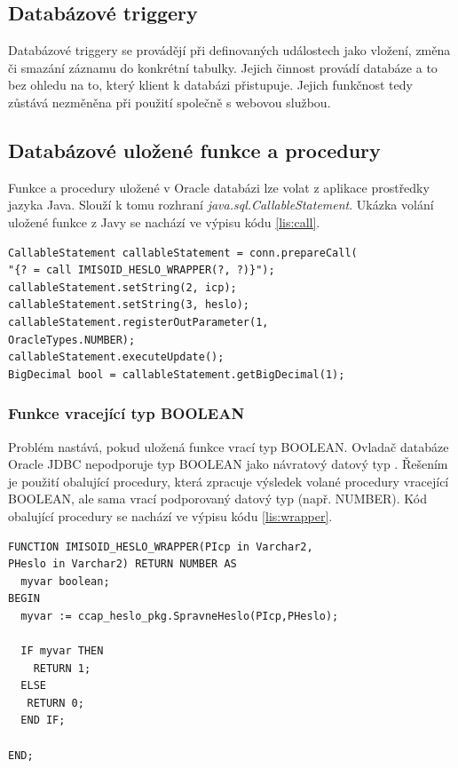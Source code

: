 \documentclass{diplomka}
\begin{document}
\subsection{Databázové triggery}
Databázové triggery se provádějí při definovaných událostech jako vložení, změna či smazání záznamu do konkrétní tabulky. Jejich činnost provádí databáze a to bez ohledu na to, který klient k databázi přistupuje. Jejich funkčnost tedy zůstává nezměněna při použití společně s webovou službou.

\subsection{Databázové uložené funkce a  procedury}
Funkce a procedury uložené v Oracle databázi lze volat z aplikace prostředky jazyka Java. Slouží k tomu rozhraní \emph{java.sql.CallableStatement}. Ukázka volání uložené funkce z Javy se nachází ve výpisu kódu \ref{lis:call}.\\

\begin{lstlisting}[label=lis:call, caption=Volání uložené procedury]
CallableStatement callableStatement = conn.prepareCall(
"{? = call IMISOID_HESLO_WRAPPER(?, ?)}");
callableStatement.setString(2, icp);
callableStatement.setString(3, heslo);
callableStatement.registerOutParameter(1, 
OracleTypes.NUMBER);
callableStatement.executeUpdate();
BigDecimal bool = callableStatement.getBigDecimal(1);
\end{lstlisting}

\subsubsection{Funkce vracející typ BOOLEAN}
Problém nastává, pokud uložená funkce vrací typ BOOLEAN. Ovladač databáze Oracle JDBC nepodporuje typ BOOLEAN jako návratový datový typ \cite{limitation}. Řešením je použití obalující procedury, která zpracuje výsledek volané procedury vracející BOOLEAN, ale sama vrací podporovaný datový typ (např. NUMBER). Kód obalující procedury se nachází ve výpisu kódu \ref{lis:wrapper}. \\

\begin{lstlisting}[label=lis:wrapper, caption=Obalující procedura]
FUNCTION IMISOID_HESLO_WRAPPER(PIcp in Varchar2,
PHeslo in Varchar2) RETURN NUMBER AS
  myvar boolean;
BEGIN
  myvar := ccap_heslo_pkg.SpravneHeslo(PIcp,PHeslo);
  
  IF myvar THEN
    RETURN 1;
  ELSE
   RETURN 0;
  END IF;  
 
END;
\end{lstlisting}
\end{document}
